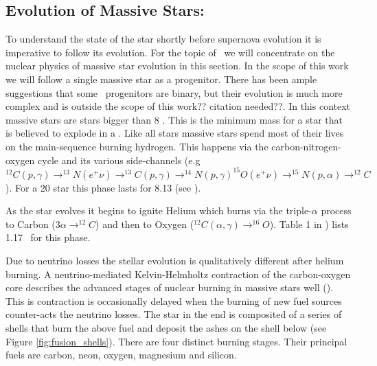 \subsection{Evolution of Massive Stars:}  To understand the state of the star shortly before supernova evolution it is imperative to follow its evolution. For the topic of \snii\ we will concentrate on the nuclear physics of massive star evolution in this section. In the scope of this work we will follow a single massive star as a progenitor. There has been ample suggestions that some \snii\ progenitors are binary, but their evolution is much more complex and is outside the scope of this work?? citation needed??.  In this context massive stars are stars bigger than 8 \msun. This is the minimum mass for a star that is believed to explode in a \snii. Like all stars massive stars spend most of their lives on the main-sequence burning hydrogen. This happens via the carbon-nitrogen-oxygen cycle and its various side-channels (e.g $^{12}C(p,\gamma)\rightarrow^{13}N(e^+\nu)\rightarrow^{13}C(p,\gamma)\rightarrow^{14}N(p,\gamma)^{15}O(e^+\nu)\rightarrow^{15}N(p,\alpha)\rightarrow^{12}C$). For a 20 \msun star this phase lasts for 8.13 \myr (see \citet{2002RvMP...74.1015W}).

As the star evolves it begins to ignite Helium which burns via the triple-$\alpha$ process to Carbon ($3\alpha\rightarrow^{12}C$) and then to Oxygen ($^{12}C(\alpha,\gamma)\rightarrow^{16}O$). Table 1 in \citet{2002RvMP...74.1015W}) lists 1.17 \myr\ for this phase. 

Due to neutrino losses the stellar evolution is qualitatively different after helium burning. A neutrino-mediated Kelvin-Helmholtz contraction of the carbon-oxygen core describes the advanced stages of nuclear burning in massive stars well (\citet{2002RvMP...74.1015W}). This is contraction is occasionally delayed when the burning of new fuel sources counter-acts the neutrino losses. The star in the end is composited of a series of shells that burn the above fuel and deposit the ashes on the shell below (see Figure \ref{fig:fusion_shells}). There are four distinct burning stages. Their principal fuels are carbon, neon, oxygen, magnesium and silicon.

